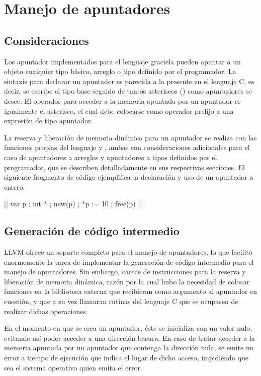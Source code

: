 {{\section{Manejo de apuntadores}

\subsection{Consideraciones}
Los apuntador implementados para el lenguaje graciela pueden apuntar a un
objeto cualquier tipo básico, arreglo o tipo definido por el programador. La
sintaxis para declarar un apuntador es parecida a la presente en  el lenguaje
C, es decir, se escribe el tipo base seguido de tantos asteriscos (\ingra{*})
como apuntadores se desee. El operador para acceder a la memoria apuntada por
un apuntador es igualmente el asterisco, el cual debe colocarse como operador
prefijo a una expresión de tipo apuntador.

La reserva y liberación de memoria dinámica para un apuntador se realiza con las
funciones propias del lenguaje  y , ambas con
consideraciones adicionales para el caso de apuntadores a arreglos y apuntadores
a tipos definidos por el programador, que se describen detalladamente en sus
respectivas secciones. El siguiente fragmento de código ejemplifica la
declaración y uso de un apuntador a entero.

\begin{gracielacode}
|[ var p : int *
;  new(p)
;  *p := 10
;  free(p)
]|
\end{gracielacode}

\subsection{Generación de código intermedio}

LLVM ofrece un soporte completo para el manejo de apuntadores, lo que facilitó
enormemente la tarea de implementar la generación de código intermedio para el
manejo de apuntadores. Sin embargo, carece de instrucciones para la reserva y
liberación de memoria dinámica, razón por la cual hubo la necesidad de colocar
funciones en la biblioteca externa que recibieran como argumento al apuntador en
cuestión, y que a su vez llamaran rutinas del lenguaje C que se ocupasen de
realizar dichas operaciones.

En el momento en que se crea un apuntador, éste se inicializa con un valor nulo,
evitando así poder acceder a una dirección basura. En caso de tratar acceder a
la memoria apuntada por un apuntador que contenga la dirección nula, se emite un
error a tiempo de ejecución que indica el lugar de dicho acceso, impidiendo que
sea el sistema operativo quien emita el error.

}}
